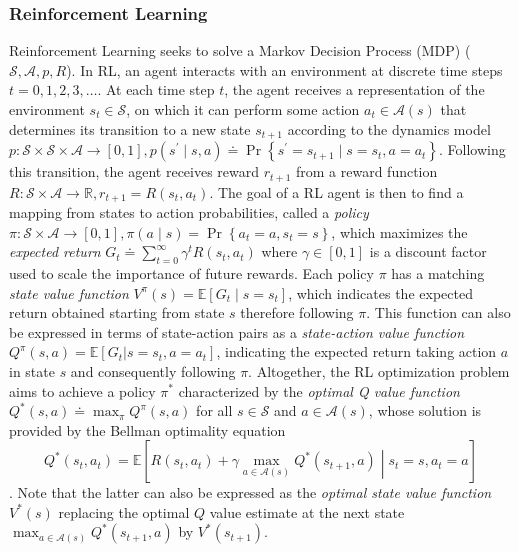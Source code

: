 \subsubsection{Reinforcement Learning}\label{sec:RL_BG}
Reinforcement Learning seeks to solve a Markov Decision Process
(MDP) ($\mathcal{S},\mathcal{A},p,R$). In
RL, an agent interacts with an environment at
discrete time steps $t=0,1,2,3,\ldots$. At each time step $t$, the
agent receives a representation of the environment $s_t \in
\mathcal{S}$, on which it can perform some action $a_t \in
\mathcal{A}(s)$ that determines its transition to a new state
$s_{t+1}$ according to the dynamics model
$p\colon\mathcal{S}\times\mathcal{S}\times\mathcal{A}\rightarrow
\left[0,1\right],p\left(s^\prime\mid
  s,a\right)\doteq\Pr\left\{s^\prime=s_{t+1}\mid
  s=s_t,a=a_t\right\}$. Following this transition, the agent receives
reward $r_{t+1}$ from a reward function
$R\colon\mathcal{S}\times\mathcal{A}\rightarrow\mathbb{R},
r_{t+1}=R\left(s_t,a_t\right)$. The goal of a RL agent is then to find
a mapping from states to action probabilities, called a \textit{policy}
$\pi\colon\mathcal{S}\times\mathcal{A}\rightarrow\left[0,1\right],
\pi\left(a\mid s\right)=\Pr\left\{a_t=a,s_t=s\right\}$, which
maximizes the \textit{expected return} $G_t\doteq
\sum_{t=0}^{\infty}\gamma^{t}R\left(s_t,a_t\right)$ where
$\gamma\in\left[0,1\right]$ is a discount factor used to scale the
importance of future rewards. Each policy $\pi$ has a matching
\textit{state value function}
$V^{\pi}\left(s\right)=\mathbb{E}\left[G_t\mid s=s_t\right]$, which
indicates the expected return obtained starting from state $s$ therefore
following $\pi$. This function can also be expressed in terms of
state-action pairs as a \textit{state-action value function}
$Q^{\pi}\left(s,a\right)=\mathbb{E}\left[G_t|s=s_t,a=a_t\right]$,
indicating the expected return taking action $a$ in state $s$ and
consequently following $\pi$. Altogether, the RL optimization problem aims
to achieve a policy $\pi^*$ characterized by the \textit{optimal Q
  value function}
$Q^*\left(s,a\right)\doteq\max_{\pi}Q^{\pi}\left(s,a\right)$ for all
$s\in\mathcal{S}$ and $a\in\mathcal{A}\left(s\right)$, whose solution
is provided by the Bellman optimality equation
\begin{equation}
Q^*\left(s_t,a_t\right)=\mathbb{E}\left[R(s_t,a_t)+\gamma
  \max_{a\in\mathcal{A}\left(s\right)}Q^*\left(s_{t+1},a\right)\middle|
  s_t=s,a_t=a\right]
\end{equation} \citep{bellman1957dynamic}. Note that the latter can
also be expressed as the \textit{optimal state value function}
$V^*\left(s\right)$ replacing the optimal $Q$ value estimate at
the next state
$\max_{a\in\mathcal{A}\left(s\right)}Q^*\left(s_{t+1},a\right)$ by
$V^*\left(s_{t+1}\right)$.

